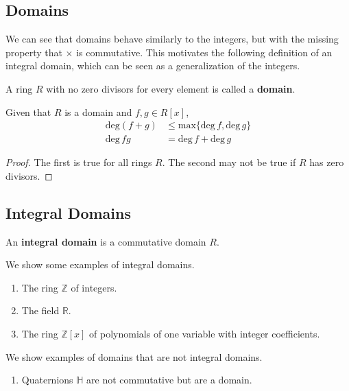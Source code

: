 \subsection{Domains}

  We can see that domains behave similarly to the integers, but with the missing property that $\times$ is commutative. This motivates the following definition of an integral domain, which can be seen as a generalization of the integers. 

  \begin{definition}[Domain]
    A ring $R$ with no zero divisors for every element is called a \textbf{domain}. 
  \end{definition} 

  \begin{theorem}
    Given that $R$ is a domain and $f, g \in R[x]$, 
    \begin{align}
      \text{deg}(f+g) & \leq \text{max}\{\text{deg}\,f, \text{deg} \,g\} \\
      \text{deg} \,f g & = \text{deg} \,f + \text{deg} \,g
    \end{align}
  \end{theorem}
  \begin{proof}
    The first is true for all rings $R$. The second may not be true if $R$ has zero divisors. 
  \end{proof}


\subsection{Integral Domains}

  \begin{definition}
    An \textbf{integral domain} is a commutative domain $R$. 
  \end{definition} 

  \begin{example}
    We show some examples of integral domains. 
    \begin{enumerate}
      \item The ring $\mathbb{Z}$ of integers. 
      \item The field $\mathbb{R}$. 
      \item The ring $\mathbb{Z}[x]$ of polynomials of one variable with integer coefficients. 
    \end{enumerate}
    We show examples of domains that are not integral domains. 
    \begin{enumerate}
      \item Quaternions $\mathbb{H}$ are not commutative but are a domain. 
    \end{enumerate}
  \end{example} 

